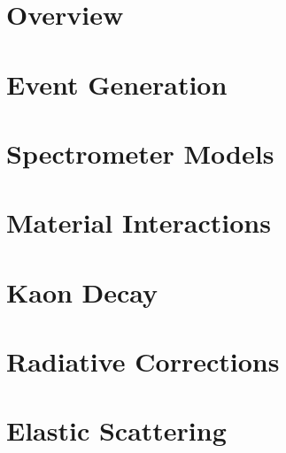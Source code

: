 \label{Chapter-6}

\hypertarget{Section-6.1}{%
\section{Overview}\label{Section-6.1}}

\hypertarget{Section-6.2}{%
\section{Event Generation}\label{Section-6.2}}

\hypertarget{Section-6.3}{%
\section{Spectrometer Models}\label{Section-6.3}}

\hypertarget{Section-6.4}{%
\section{Material Interactions}\label{Section-6.4}}

\hypertarget{Section-6.5}{%
\section{Kaon Decay}\label{Section-6.5}}

\hypertarget{Section-6.6}{%
\section{Radiative Corrections}\label{Section-6.6}}

\hypertarget{Section-6.7}{%
\section{Elastic Scattering}\label{Section-6.7}}


